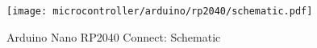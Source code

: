 \begin{frame}
    \begin{figure}
        \texttt{[image: microcontroller/arduino/rp2040/schematic.pdf]}
        \caption{Arduino\textregistered{} Nano RP2040 Connect: Schematic}
    \end{figure}
\end{frame}